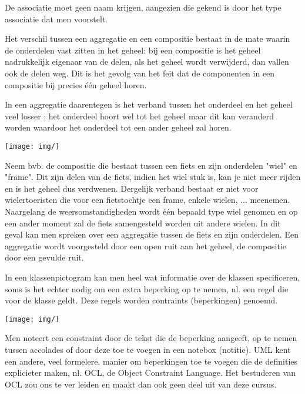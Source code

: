 De associatie moet geen naam krijgen, aangezien die gekend is door het type associatie dat men voorstelt.

Het verschil tussen een aggregatie en een compositie bestaat in de mate waarin de onderdelen vast zitten in het geheel: bij een compositie is het geheel nadrukkelijk eigenaar van de delen, als het geheel wordt verwijderd, dan vallen ook de delen weg. Dit is het gevolg van het feit dat de componenten in een compositie bij precies één geheel horen.

In een aggregatie daarentegen is het verband tussen het onderdeel en het
geheel veel losser : het onderdeel hoort wel tot het geheel maar dit kan veranderd worden waardoor het onderdeel tot een ander geheel zal horen.


\begin{center}
\texttt{[image: img/]}%
\label{labelname}%
\end{center}

Neem bvb. de compositie die bestaat tussen een fiets en zijn onderdelen "wiel" en "frame". Dit zijn delen van de fiets, indien het wiel stuk is, kan je niet meer rijden en is het geheel dus verdwenen.
Dergelijk verband bestaat er niet voor wielertoeristen die voor een fietstochtje een frame, enkele wielen, ... meenemen. Naargelang de weersomstandigheden wordt één bepaald type wiel genomen en op een ander moment zal de fiets samengesteld worden uit andere wielen. In dit geval kan men spreken over een aggregatie tussen de fiets en zijn onderdelen.
Een aggregatie wordt voorgesteld door een open ruit aan het geheel, de compositie door een gevulde ruit.


In een klassenpictogram kan men heel wat informatie over de klassen specificeren, soms is het echter nodig om een extra beperking op te nemen, nl. een regel die voor de klasse geldt. Deze regels worden contraints (beperkingen) genoemd.


\begin{center}
\texttt{[image: img/]}%
\label{labelname}%
\end{center}

Men noteert een constraint door de tekst die de beperking aangeeft, op te nemen tussen accolades of door deze toe te voegen in een notebox (notitie). UML kent een andere, veel formelere, manier om beperkingen toe te voegen die de definities explicieter maken, nl. OCL, de Object Constraint Language.
Het bestuderen van OCL zou ons te ver leiden en maakt dan ook geen deel uit van deze cursus.

